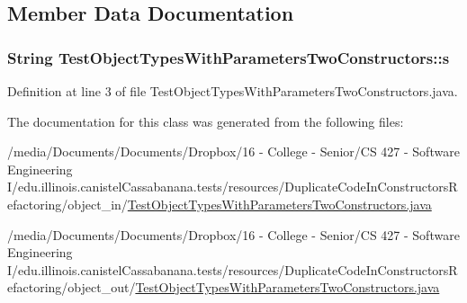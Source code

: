\subsection{Member Data Documentation}
\hypertarget{classTestObjectTypesWithParametersTwoConstructors_abe96b03841f438000a162b68ee07af9f}{
\subsubsection[{s}]{\setlength{\rightskip}{0pt plus 5cm}String {\bf TestObjectTypesWithParametersTwoConstructors::s}}}
\label{classTestObjectTypesWithParametersTwoConstructors_abe96b03841f438000a162b68ee07af9f}


Definition at line 3 of file TestObjectTypesWithParametersTwoConstructors.java.



The documentation for this class was generated from the following files:\begin{DoxyCompactItemize}
\item 
/media/Documents/Documents/Dropbox/16 -\/ College -\/ Senior/CS 427 -\/ Software Engineering I/edu.illinois.canistelCassabanana.tests/resources/DuplicateCodeInConstructorsRefactoring/object\_\-in/\hyperlink{object__in_2TestObjectTypesWithParametersTwoConstructors_8java}{TestObjectTypesWithParametersTwoConstructors.java}\item 
/media/Documents/Documents/Dropbox/16 -\/ College -\/ Senior/CS 427 -\/ Software Engineering I/edu.illinois.canistelCassabanana.tests/resources/DuplicateCodeInConstructorsRefactoring/object\_\-out/\hyperlink{object__out_2TestObjectTypesWithParametersTwoConstructors_8java}{TestObjectTypesWithParametersTwoConstructors.java}\end{DoxyCompactItemize}
